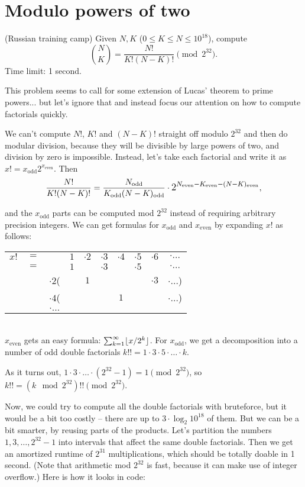 \section{Modulo powers of two}
\begin{framed}
\noindent
(Russian training camp) Given $N, K$ ($0 \le K \le N \le 10^{18}$), compute
\[
\binom N K = \frac{N!}{K!(N-K)!} \pmod {2^{32}}.
\]
Time limit: 1 second.
\end{framed}
This problem seems to call for some extension of Lucas' theorem to prime powers... but let's ignore that and instead focus our attention on how to compute factorials quickly.

\newcommand{\odd}[1]{#1_\text{odd}}
\newcommand{\even}[1]{#1_\text{even}}

We can't compute $N!$, $K!$ and $(N-K)!$ straight off modulo $2^{32}$ and then do modular division, because they will be divisible by large powers of two, and division by zero is impossible.
Instead, let's take each factorial and write it as $x! = \odd{x}2^{\even{x}}$. Then
\[
\frac{N!}{K!(N-K)!} =
\frac{\odd N}{\odd K \odd{(N-K)}} \cdot \mathlarger{2^{\even N - \even K - \even{(N-K)}}},
\]

and the $\odd x$ parts can be computed mod $2^{32}$ instead of requiring arbitrary precision integers.
We can get formulas for $\odd x$ and $\even x$ by expanding $x!$ as follows: \\
\begin{tabular}{cccccccccc}
$x!$&$=$&          &$1$& $\cdot 2$ &$\cdot 3$ &$\cdot 4$ &$\cdot 5$ & $\cdot 6$ & $\cdot \ldots$ \\
    &$=$&          &$1$&           &$\cdot 3$ &          &$\cdot 5$ &           & $\cdot \ldots$ \\
    &   &$\cdot 2$(&   & $1$       &          &          &          & $\cdot 3$ & $\cdot \ldots$)\\
    &   &$\cdot 4$(&   &           &          &  $1$     &          &           & $\cdot \ldots$)\\
    &   &$\cdot \ldots$ &
\end{tabular}
\\
$\even x$ gets an easy formula: $\sum_{k=1}^\infty \lfloor x / 2^k\rfloor$.
For $\odd x$, we get a decomposition into a number of odd double factorials $k!! = 1 \cdot 3 \cdot 5 \cdot \ldots \cdot k$.

As it turns out, $1 \cdot 3 \cdot \ldots \cdot (2^{32}-1) = 1 \pmod{2^{32}}$, so $k!! = (k \mod 2^{32})!! \pmod{2^{32}}$.

Now, we could try to compute all the double factorials with bruteforce, but it would be a bit too costly -- there are up to $3 \cdot \log_2{10^{18}}$ of them.
But we can be a bit smarter, by reusing parts of the products.
Let's partition the numbers $1, 3, \dots, 2^{32}-1$ into intervals that affect the same double factorials.
Then we get an amortized runtime of $2^{31}$ multiplications, which should be totally doable in 1 second.
(Note that arithmetic mod $2^{32}$ is fast, because it can make use of integer overflow.)
Here is how it looks in code:

